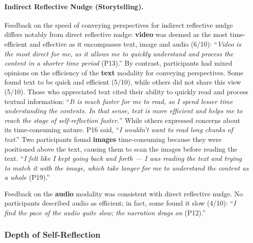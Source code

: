 \paragraph{Indirect Reflective Nudge (Storytelling).} 
Feedback on the speed of conveying perspectives for indirect reflective nudge differs notably from direct reflective nudge: \textbf{video} was deemed as the most time-efficient and effective as it encompasses text, image and audio (6/10): ``\textit{Video is the most direct for me, as it allows me to quickly understand and process the content in a shorter time period} (P13).''
By contrast, participants had mixed opinions on the efficiency of the \textbf{text} modality for conveying perspectives. Some found text to be quick and efficient (5/10), while others did not share this view (5/10). Those who appreciated text cited their ability to quickly read and process textual information: ``\textit{It is much faster for me to read, so I spend lesser time understanding the contents. In that sense, text is more efficient and helps me to reach the stage of self-reflection faster.}'' While others expressed concerns about its time-consuming nature. P16 said, ``\textit{I wouldn't want to read long chunks of text}.'' %
Two participants found \textbf{images} time-consuming because they were positioned above the text, causing them to scan the images before reading the text. ``\textit{I felt like I kept going back and forth — I was reading the text and trying to match it with the image, which take longer for me to understand the content as a whole} (P19).''

Feedback on the \textbf{audio} modality was consistent with direct reflective nudge. No participants described audio as efficient; in fact, some found it slow (4/10): ``\textit{I find the pace of the audio quite slow; the narration drags on} (P12).''

\subsubsection{Depth of Self-Reflection}

